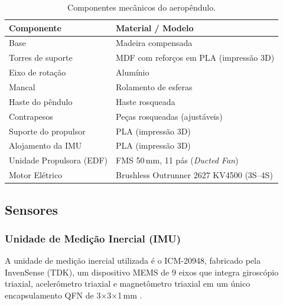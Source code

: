 \begin{table}[H]
    \centering
    \caption{Componentes mecânicos do aeropêndulo.}
    \label{tab:componentes_mecanicos}
    \begin{tabular}{ll}
        \toprule
        \textbf{Componente}       & \textbf{Material / Modelo}              \\
        \midrule
        Base                      & Madeira compensada                      \\
        Torres de suporte         & MDF com reforços em PLA (impressão 3D)  \\
        Eixo de rotação           & Alumínio                                \\
        Mancal                    & Rolamento de esferas                    \\
        Haste do pêndulo          & Haste rosqueada                         \\
        Contrapesos               & Peças rosqueadas (ajustáveis)           \\
        Suporte do propulsor      & PLA (impressão 3D)                      \\
        Alojamento da IMU         & PLA (impressão 3D)                      \\
        Unidade Propulsora (EDF)  & FMS 50\,mm, 11 pás (\textit{Ducted Fan}) \\
        Motor Elétrico            & Brushless Outrunner 2627 KV4500 (3S--4S)\\
        \bottomrule
    \end{tabular}
\end{table}

\subsection{Sensores}

\subsubsection{Unidade de Medição Inercial (IMU)}

A unidade de medição inercial utilizada é o ICM-20948, fabricado pela InvenSense (TDK), um dispositivo MEMS de 9 eixos que integra giroscópio triaxial, acelerômetro triaxial e magnetômetro triaxial em um único encapsulamento QFN de 3$\times$3$\times$1\,mm \cite{invensense2021icm20948}.


